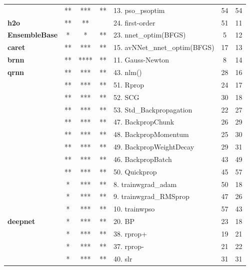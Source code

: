 \begin{Schunk}
\begin{table}
\begin{tabular}[t]{>{\bfseries}lccclcc}
\multirow{-3}{*}{\raggedright\arraybackslash CaDENCE} & ** & *** & ** & 13. pso\_psoptim & 54 & 54\\
\cmidrule{1-7}
h2o & ** & ** &  & 24. first-order & 51 & 11\\
\cmidrule{1-7}
EnsembleBase & * & * & ** & 23. nnet\_optim(BFGS) & 5 & 12\\
\cmidrule{1-7}
caret & ** & *** & ** & 15. avNNet\_nnet\_optim(BFGS) & 17 & 13\\
\cmidrule{1-7}
brnn & ** & **** & ** & 11. Gauss-Newton & 8 & 14\\
\cmidrule{1-7}
qrnn & ** & *** & ** & 43. nlm() & 28 & 16\\
\cmidrule{1-7}
 & ** & *** & ** & 51. Rprop & 24 & 17\\

 & ** & *** & ** & 52. SCG & 30 & 18\\

 & ** & *** & ** & 53. Std\_Backpropagation & 22 & 27\\

 & ** & *** & ** & 47. BackpropChunk & 26 & 29\\

 & ** & *** & ** & 48. BackpropMomentum & 25 & 30\\

 & ** & *** & ** & 49. BackpropWeightDecay & 29 & 31\\

 & ** & *** & ** & 46. BackpropBatch & 43 & 49\\

\multirow{-8}{*}{\raggedright\arraybackslash RSNNS} & ** & *** & ** & 50. Quickprop & 45 & 57\\
\cmidrule{1-7}
 & * & *** & ** & 8. trainwgrad\_adam & 50 & 18\\

 & * & *** & ** & 9. trainwgrad\_RMSprop & 47 & 26\\

\multirow{-3}{*}{\raggedright\arraybackslash automl} & * & *** & ** & 10. trainwpso & 57 & 43\\
\cmidrule{1-7}
deepnet & * & *** & ** & 20. BP & 23 & 18\\
\cmidrule{1-7}
 & * & *** & ** & 38. rprop+ & 19 & 21\\

 & * & *** & ** & 37. rprop- & 21 & 22\\

 & * & *** & ** & 40. slr & 31 & 31\\


\end{tabular}
\end{table}
\end{Schunk}
